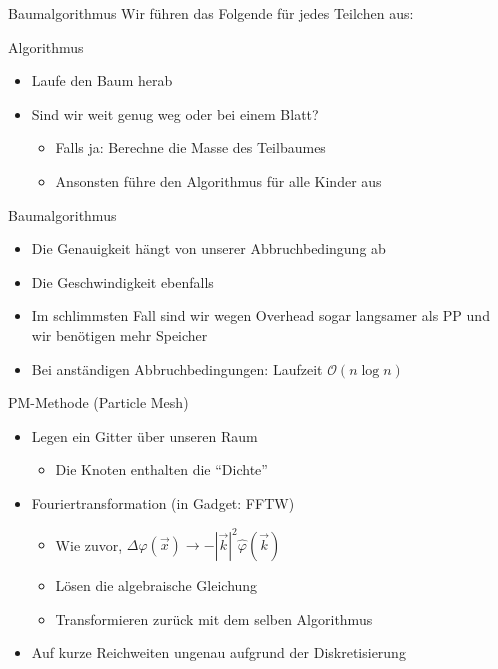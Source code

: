 \documentclass{beamer}
\begin{document}
\begin{frame}{Baumalgorithmus}
  Wir führen das Folgende für jedes Teilchen aus:\vskip10pt
  \begin{block}{Algorithmus}
    \begin{itemize}
      \item Laufe den Baum herab \pause \vskip10pt
      \item Sind wir weit genug weg oder bei einem Blatt? \pause
        \begin{itemize}
          \item Falls ja: Berechne die Masse des Teilbaumes
          \item Ansonsten führe den Algorithmus für alle Kinder aus
        \end{itemize}
    \end{itemize}
  \end{block}
\end{frame}

\begin{frame}{Baumalgorithmus}
  \begin{itemize}
    \item Die Genauigkeit hängt von unserer Abbruchbedingung ab \pause
    \item Die Geschwindigkeit ebenfalls \pause
    \item Im schlimmsten Fall sind wir wegen Overhead sogar langsamer als PP
      und wir benötigen mehr Speicher
      \pause
      \vskip20pt
    \item Bei anständigen Abbruchbedingungen: Laufzeit $\mathcal{O}(n\log n)$
  \end{itemize}
\end{frame}

\begin{frame}{PM-Methode (Particle Mesh)}
  \begin{itemize}
    \item Legen ein Gitter über unseren Raum
      \begin{itemize}
        \item Die Knoten enthalten die "`Dichte"'
      \end{itemize}
      \pause
      \vskip10pt
    \item Fouriertransformation (in Gadget: FFTW)
      \begin{itemize}
        \item Wie zuvor, $\Delta \varphi(\vec x) \to
          -\left|\vec k\right|^2\hat{\varphi}(\vec k)$
        \item Lösen die algebraische Gleichung
          \vskip5pt
        \item Transformieren zurück mit dem selben Algorithmus
      \end{itemize}
      \pause
      \vskip10pt
    \item Auf kurze Reichweiten ungenau aufgrund der Diskretisierung
  \end{itemize}
\end{frame}
\end{document}
